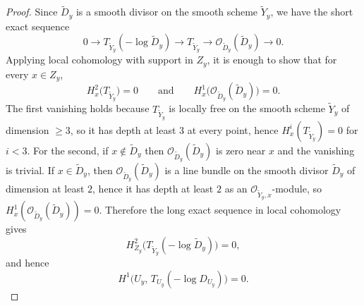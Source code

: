 \documentclass[12pt,twoside,]{amsart}
\theoremstyle{plain}
\theoremstyle{definition}
\begin{document}
\begin{proof}
Since $\widetilde D_y$ is a smooth divisor on the smooth scheme
$\widetilde Y_y$, we have the short exact sequence
\[
0\longrightarrow T_{\widetilde Y_y}(-\log \widetilde D_y)
\longrightarrow T_{\widetilde Y_y}
\longrightarrow \mathcal O_{\widetilde D_y}(\widetilde D_y)
\longrightarrow 0.
\]
Applying local cohomology with support in $Z_y$, it is enough to
show that for every $x\in Z_y$,
\[
H^2_x\bigl(T_{\widetilde Y_y}\bigr)=0
\qquad\text{and}\qquad
H^1_x\bigl(\mathcal O_{\widetilde D_y}(\widetilde D_y)\bigr)=0.
\]
The first vanishing holds because
$T_{\widetilde Y_y}$ is locally free on the
smooth scheme $\widetilde Y_y$ of dimension $\ge 3$,
so it has depth at least $3$ at every point, hence
$H^i_x(T_{\widetilde Y_y}) = 0$ for $i < 3$.
For the second, if $x \notin \widetilde D_y$ then
$\mathcal{O}_{\widetilde D_y}(\widetilde D_y)$ is zero near $x$
and the vanishing is trivial. If $x \in \widetilde D_y$, then
$\mathcal O_{\widetilde D_y}(\widetilde D_y)$ is a line bundle on the
smooth divisor $\widetilde D_y$ of dimension at least $2$,
hence it has depth at least $2$ as an
$\mathcal{O}_{\widetilde Y_y,x}$-module, so
$H^1_x(\mathcal O_{\widetilde D_y}(\widetilde D_y))=0$.
Therefore the long exact sequence in local cohomology gives
\[
H^2_{Z_y}\bigl(
T_{\widetilde Y_y}(-\log \widetilde D_y)\bigr)=0,
\]
and hence
\[
H^1\bigl(U_y,\,T_{U_y}(-\log D_{U_y})\bigr)=0.
\]
\end{proof}
\end{document}
